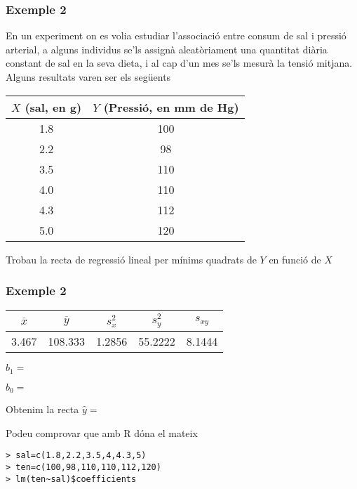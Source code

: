 \documentclass[12pt,t]{beamer}
\theoremstyle{plain}
\theoremstyle{definition}
\begin{document}
\begin{frame}
\frametitle{Exemple 2}
En un experiment on es volia estudiar l'associació entre consum de sal i pressió arterial, a alguns individus se'ls assignà aleatòriament una quantitat diària constant de sal en la seva dieta, i al cap d'un mes se'ls mesurà la tensió mitjana. Alguns resultats varen ser els següents
\begin{center}
\begin{tabular}{cc}
$X$ (sal, en g) 	& $Y$ (Pressió, en mm de Hg)\\ \hline
1.8 &	100\\
2.2 &	98\\
3.5 &	110\\
4.0 &	110\\
4.3 &	112\\
5.0 &	120\\
\end{tabular}
\end{center}
Trobau la recta de regressió lineal per mínims quadrats de $Y$ en funció de $X$

\end{frame}

\begin{frame}[fragile]
\frametitle{Exemple 2}

\begin{center}
\begin{tabular}{ccccc}
$\overline{x}$ &  $\overline{y}$ & $s_x^2$ & $s_y^2$ & $s_{xy}$\\ \hline
3.467 & 108.333 & 1.2856 &55.2222 & 8.1444
\end{tabular}
\end{center}
\bigskip

$b_1 =$\bigskip

$b_0 =$\bigskip

Obtenim la recta $\widehat{y}=$
\bigskip

Podeu  comprovar que amb R dóna el mateix
\begin{verbatim}
> sal=c(1.8,2.2,3.5,4,4.3,5)
> ten=c(100,98,110,110,112,120)
> lm(ten~sal)$coefficients
\end{verbatim}
\end{frame}
\end{document}

